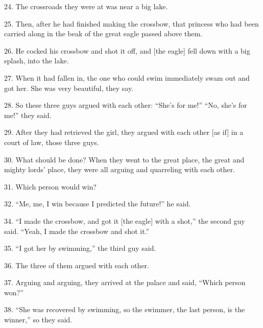 24. The crossroads they were at was near a big lake.

25. Then, after he had finished making the crossbow, that princess who had been
carried along in the beak of the great eagle passed above them.

26. He cocked his crossbow and shot it off, and [the eagle] fell down with a big
splash, into the lake.

27. When it had fallen in, the one who could swim immediately swam out and got
her. She was very beautiful, they say.

28. So these three guys argued with each other: ``She's for me!'' ``No, she's for
me!'' they said.

29. After they had retrieved the girl, they argued with each other [as if] in a
court of law, those three guys.

30. What should be done? When they went to the great place, the great and mighty
lords' place, they were all arguing and quarreling with each other.

31. Which person would win?

32. ``Me, me, I win because I predicted the future!'' he said.

34. ``I made the crossbow, and got it [the eagle] with a shot,'' the second guy
said. ``Yeah, I made the crossbow and shot it.''

35. ``I got her by swimming,'' the third guy said.

36. The three of them argued with each other.

37. Arguing and arguing, they arrived at the palace and said, ``Which person won?''

38. ``She was recovered by swimming, so the swimmer, the last person, is the winner,''
so they said.


